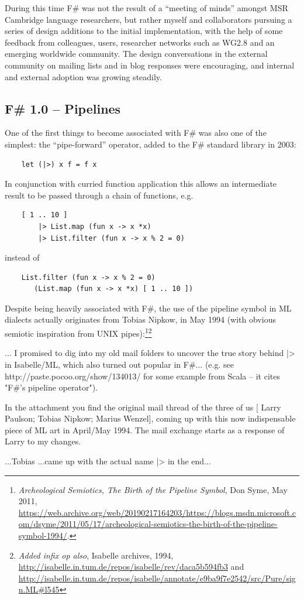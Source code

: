 \documentclass[acmsmall]{acmart}\settopmatter{}
\begin{document}
During this time F\# was not the result of a “meeting of minds” amongst MSR Cambridge language researchers, but rather myself and collaborators pursuing a series of design additions to the initial implementation, with the help of some feedback from colleagues, users, researcher networks such as WG2.8 and an emerging worldwide community.  The design conversations in the external community on mailing lists and in blog responses were encouraging, and internal and external adoption was growing steadily. 
\subsection*{F\# 1.0 – Pipelines}

One of the first things to become associated with F\# was also one of the simplest: the “pipe-forward” operator, added to the F\# standard library in 2003:
\begin{verbatim}
    let (|>) x f = f x
\end{verbatim}
In conjunction with curried function application this allows an intermediate result to be passed through a chain of functions, e.g.
\begin{verbatim}
    [ 1 .. 10 ] 
        |> List.map (fun x -> x *x) 
        |> List.filter (fun x -> x % 2 = 0)
\end{verbatim}
instead of 
\begin{verbatim}
    List.filter (fun x -> x % 2 = 0) 
       (List.map (fun x -> x *x) [ 1 .. 10 ])
\end{verbatim}
Despite being heavily associated with F\#, the use of the pipeline symbol in ML dialects actually originates from Tobias Nipkow, in May 1994 (with obvious semiotic inspiration from UNIX pipes):\footnote{\textit{Archeological Semiotics, The Birth of the Pipeline Symbol}, Don Syme, May 2011, \url{https://web.archive.org/web/20190217164203/https://blogs.msdn.microsoft.com/dsyme/2011/05/17/archeological-semiotics-the-birth-of-the-pipeline-symbol-1994/}.}\footnote{\textit{Added infix op also}, Isabelle archives, 1994, \url{http://isabelle.in.tum.de/repos/isabelle/rev/daca5b594fb3} and \url{http://isabelle.in.tum.de/repos/isabelle/annotate/e9ba9f7e2542/src/Pure/sign.ML\#l545}}
\begin{verbquote}
... I promised to dig into my old mail folders to uncover the true story behind |> in Isabelle/ML, which also turned out popular in F#... (e.g. see http://paste.pocoo.org/show/134013/ for some example from Scala -- it cites "F#'s pipeline operator"). 

In the attachment you find the original mail thread of the three of us [ Larry Paulson; Tobias Nipkow; Marius Wenzel], coming up with this now indispensable piece of ML art in April/May 1994. The mail exchange starts as a response of Larry to my changes.  

...Tobias ...came up with the actual name |> in the end...
\end{verbquote}
\end{document}
